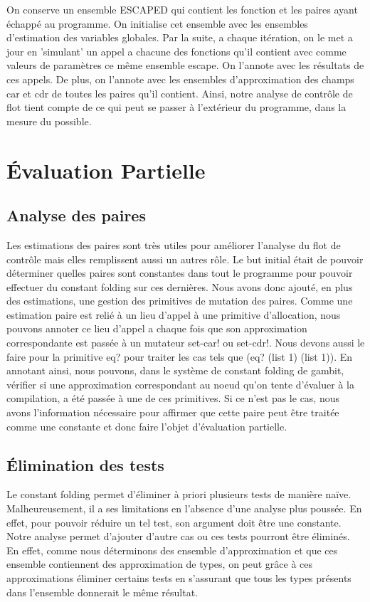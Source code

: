On conserve un ensemble ESCAPED qui contient les fonction et les
paires ayant échappé au programme. On initialise cet ensemble avec les
ensembles d'estimation des variables globales. Par la suite, a chaque
itération, on le met a jour en 'simulant' un appel a chacune des
fonctions qu'il contient avec comme valeurs de paramètres ce même
ensemble escape. On l'annote avec les résultats de ces appels. De
plus, on l'annote avec les ensembles d'approximation des champs car et
cdr de toutes les paires qu'il contient. Ainsi, notre analyse de
contrôle de flot tient compte de ce qui peut se passer à l'extérieur
du programme, dans la mesure du possible.

\clearpage

\section{Évaluation Partielle}

\subsection{Analyse des paires}

Les estimations des paires sont très utiles pour améliorer l'analyse
du flot de contrôle mais elles remplissent aussi un autres rôle. Le
but initial était de pouvoir déterminer quelles paires sont constantes
dans tout le programme pour pouvoir effectuer du constant folding sur
ces dernières. Nous avons donc ajouté, en plus des estimations, une
gestion des primitives de mutation des paires. Comme une estimation
paire est relié à un lieu d'appel à une primitive d'allocation, nous
pouvons annoter ce lieu d'appel a chaque fois que son approximation
correspondante est passée à un mutateur set-car! ou set-cdr!. Nous
devons aussi le faire pour la primitive eq?  pour traiter les cas tels
que (eq? (list 1) (list 1)). En annotant ainsi, nous pouvons, dans le
système de constant folding de gambit, vérifier si une approximation
correspondant au noeud qu'on tente d'évaluer à la compilation, a été
passée à une de ces primitives. Si ce n'est pas le cas, nous avons
l'information nécessaire pour affirmer que cette paire peut être
traitée comme une constante et donc faire l'objet d'évaluation
partielle.

\subsection{Élimination des tests}

Le constant folding permet d'éliminer à priori plusieurs tests de
manière naïve. Malheureusement, il a ses limitations en l'absence
d'une analyse plus poussée. En effet, pour pouvoir réduire un tel
test, son argument doit être une constante.  Notre analyse permet
d'ajouter d'autre cas ou ces tests pourront être éliminés. En effet,
comme nous déterminons des ensemble d'approximation et que ces
ensemble contiennent des approximation de types, on peut grâce à ces
approximations éliminer certains tests en s'assurant que tous les
types présents dans l'ensemble donnerait le même résultat.

